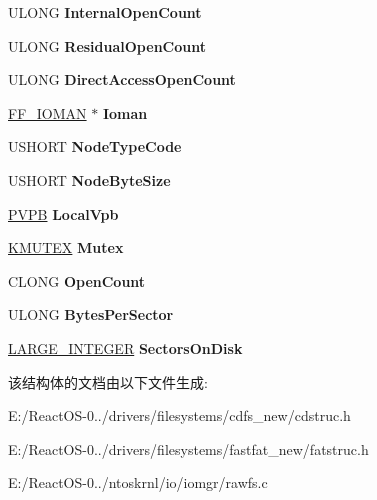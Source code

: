 \begin{DoxyCompactItemize}
U\+L\+O\+NG {\bfseries Internal\+Open\+Count}
\item 
\mbox{\label{struct___v_c_b_aa92beaca95520a5b38e6aa9518c4957a}} 
U\+L\+O\+NG {\bfseries Residual\+Open\+Count}
\item 
\mbox{\label{struct___v_c_b_ab9d6e0ce6f2bb0348ece6fa68d0bd5b9}} 
U\+L\+O\+NG {\bfseries Direct\+Access\+Open\+Count}
\item 
\mbox{\label{struct___v_c_b_ad9058318a1ef786eb65b011094a82b26}} 
\hyperlink{struct_f_f___i_o_m_a_n}{F\+F\+\_\+\+I\+O\+M\+AN} $\ast$ {\bfseries Ioman}
\item 
\mbox{\label{struct___v_c_b_a975aa2674c7e38446bdc7213cc02e182}} 
U\+S\+H\+O\+RT {\bfseries Node\+Type\+Code}
\item 
\mbox{\label{struct___v_c_b_a259cc005395f7a86677cad605cfb91b9}} 
U\+S\+H\+O\+RT {\bfseries Node\+Byte\+Size}
\item 
\mbox{\label{struct___v_c_b_a6aa29f5bbf785ff422393dffc60b614f}} 
\hyperlink{struct___v_p_b}{P\+V\+PB} {\bfseries Local\+Vpb}
\item 
\mbox{\label{struct___v_c_b_abb0ef12262e4121ecacec92aa0e9577a}} 
\hyperlink{struct___k_m_u_t_a_n_t}{K\+M\+U\+T\+EX} {\bfseries Mutex}
\item 
\mbox{\label{struct___v_c_b_a1a40204f37b4ad1516d3549730811940}} 
C\+L\+O\+NG {\bfseries Open\+Count}
\item 
\mbox{\label{struct___v_c_b_a8fcc50fdfd6c7df184216e7d02fb1cf2}} 
U\+L\+O\+NG {\bfseries Bytes\+Per\+Sector}
\item 
\mbox{\label{struct___v_c_b_ae2e7c36598c8599cae16781076442c98}} 
\hyperlink{union___l_a_r_g_e___i_n_t_e_g_e_r}{L\+A\+R\+G\+E\+\_\+\+I\+N\+T\+E\+G\+ER} {\bfseries Sectors\+On\+Disk}
\end{DoxyCompactItemize}


该结构体的文档由以下文件生成\+:\begin{DoxyCompactItemize}
\item 
E\+:/\+React\+O\+S-\/0../drivers/filesystems/cdfs\+\_\+new/cdstruc.\+h\item 
E\+:/\+React\+O\+S-\/0../drivers/filesystems/fastfat\+\_\+new/fatstruc.\+h\item 
E\+:/\+React\+O\+S-\/0../ntoskrnl/io/iomgr/rawfs.\+c\end{DoxyCompactItemize}
